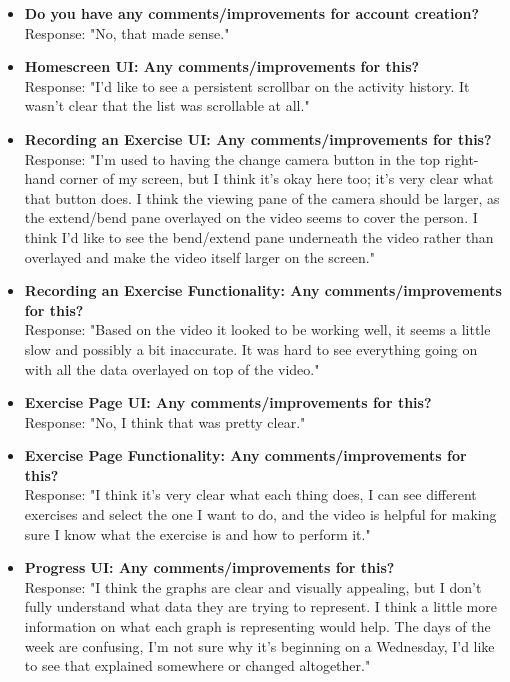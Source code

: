 \documentclass[12pt, titlepage]{article}
\begin{document}
\begin{itemize}
    \item \textbf{Do you have any comments/improvements for account creation?} \\
    Response: "No, that made sense."

    \item \textbf{Homescreen UI: Any comments/improvements for this?} \\
    Response: "I'd like to see a persistent scrollbar on the activity history. It wasn't clear that the list was scrollable at all."

    \item \textbf{Recording an Exercise UI: Any comments/improvements for this?} \\
    Response: "I'm used to having the change camera button in the top right-hand corner of my screen, but I think it's okay here too; it's very clear what that button does. I think the viewing pane of the camera should be larger, as the extend/bend pane overlayed on the video seems to cover the person. I think I'd like to see the bend/extend pane underneath the video rather than overlayed and make the video itself larger on the screen."

    \item \textbf{Recording an Exercise Functionality: Any comments/improvements for this?} \\
    Response: "Based on the video it looked to be working well, it seems a little slow and possibly a bit inaccurate. It was hard to see everything going on with all the data overlayed on top of the video."

    \item \textbf{Exercise Page UI: Any comments/improvements for this?} \\
    Response: "No, I think that was pretty clear."

    \item \textbf{Exercise Page Functionality: Any comments/improvements for this?} \\
    Response: "I think it's very clear what each thing does, I can see different exercises and select the one I want to do, and the video is helpful for making sure I know what the exercise is and how to perform it."

    \item \textbf{Progress UI: Any comments/improvements for this?} \\
    Response: "I think the graphs are clear and visually appealing, but I don't fully understand what data they are trying to represent. I think a little more information on what each graph is representing would help. The days of the week are confusing, I'm not sure why it's beginning on a Wednesday, I'd like to see that explained somewhere or changed altogether."
\end{itemize}
\end{document}
